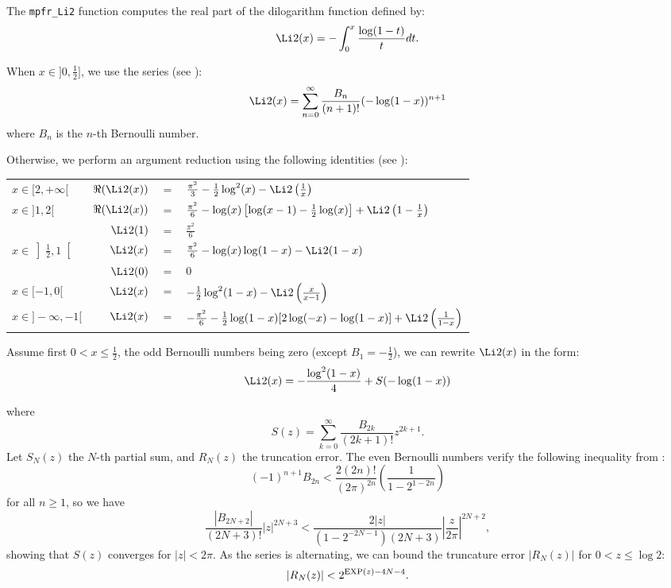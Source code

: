 \documentclass[12pt]{amsart}
\def\Exp{{\rm EXP}}
\begin{document}
The \texttt{mpfr\_Li2} function computes the real part of the dilogarithm 
function defined by:
\[
\Li2(x) = - \int_0^x \frac{\log(1-t)}{t} dt.
\]


When $x \in ]0, \frac{1}{2}]$, we use the series 
(see \cite[p178]{Vollinga}):
\[
\Li2(x) = \sum_{n=0}^\infty \frac{B_n}{(n+1)!} (-\log(1-x))^{n+1}
\]
where $B_n$ is the $n$-th Bernoulli number.

Otherwise, we perform an argument reduction using the following identities 
(see \cite[p200]{Ginsberg}):

\begin{tabular}{l r c l}
$x \in [2, +\infty[ $&$ \Re(\Li2(x)) $&$=$&$ \frac{\pi^2}{3}
- \frac{1}{2}\log^2(x) - \Li2\left(\frac{1}{x}\right) $\\
$x \in ]1, 2[ $&$ \Re(\Li2(x)) $&$=$&$ \frac{\pi^2}{6}-\log(x)\left[\log(x-1)
- \frac{1}{2} \log(x)\right] + \Li2\left(1 - \frac{1}{x}\right)  $\\
 &$ \Li2(1) $&$=$&$ \frac{\pi^2}{6} $\\
$x \in \left]\frac{1}{2}, 1\right[ $&$ \Li2(x) $&$=$&$ \frac{\pi^2}{6}
- \log(x) \log(1 - x) - \Li2(1 - x) $\\
 &$ \Li2(0) $&$=$&$ 0 $\\
$x \in [-1, 0[ $&$
\Li2(x) $&$=$&$ -\frac{1}{2} \log^2(1-x) - \Li2\left(\frac{x}{x - 1}\right)$\\
$x \in ]-\infty, -1[ $&$ \Li2(x) $&$=$&$ -\frac{\pi^2}{6} 
- \frac{1}{2} \log(1 -x) [2 \log(-x) - \log(1 - x)]
+ \Li2\left(\frac{1}{1 - x}\right)$
\end{tabular}


Assume first $0 < x \leq \frac{1}{2}$, the odd Bernoulli numbers being zero
(except $B_1 = -\frac{1}{2}$), we can rewrite $\Li2(x)$ in the form:
\[
\Li2(x) = - \frac{\log^2(1-x)}{4} + S(-\log(1-x))
\]

where  
\[
S(z) = \sum_{k=0}^\infty \frac{B_{2k}}{(2k+1)!} z^{2k+1}.
\]
Let $S_N(z)$ the $N$-th partial sum, and $R_N(z)$ the truncation error.
The even Bernoulli numbers verify the following inequality 
from \cite[p805]{AbSt73}:
\[
(-1)^{n+1}B_{2n} < \frac{2(2n)!}{(2\pi)^{2n}}
\left(\frac{1}{1 - 2^{1-2n}}\right)
\]
for all $n \geq 1$, so we have 
\[
\frac{|B_{2N+2}|}{(2N+3)!}|z|^{2N+3} <
\frac{2|z|}{(1-2^{-2N-1})(2N+3)} \left|\frac{z}{2 \pi}\right|^{2N+2},
\]
showing that $S(z)$ converges for $|z| < 2 \pi$.
As the series is alternating, we can bound the truncature error $|R_N(z)|$ for
$0 < z \leq \log 2$:
\[
|R_N(z)| < 2^{\Exp(z)-4N-4}.
\]
\end{document}
